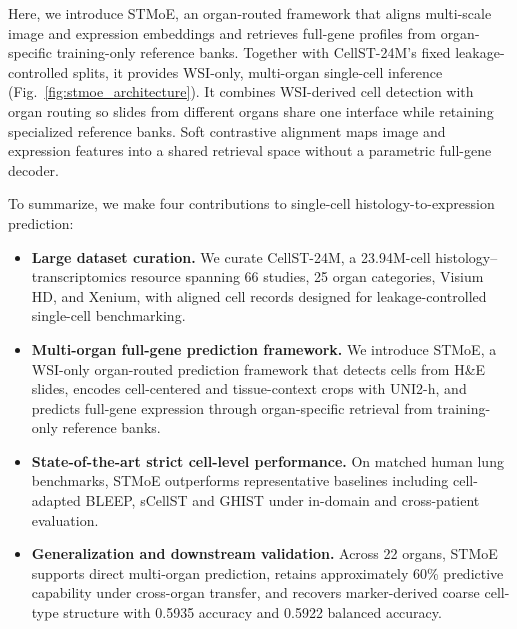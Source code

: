 \documentclass[sigconf]{acmart}
\newcommand{\dataset}{CellST-24M\xspace}
\newcommand{\method}{STMoE\xspace}
\begin{document}
Here, we introduce \method{}, an organ-routed framework that aligns multi-scale image and expression embeddings and retrieves full-gene profiles from organ-specific training-only reference banks. Together with \dataset{}'s fixed leakage-controlled splits, it provides WSI-only, multi-organ single-cell inference (Fig.~\ref{fig:stmoe_architecture}). It combines WSI-derived cell detection with organ routing so slides from different organs share one interface while retaining specialized reference banks. Soft contrastive alignment maps image and expression features into a shared retrieval space without a parametric full-gene decoder.

To summarize, we make four contributions to single-cell histology-to-expression prediction:
\begin{itemize}[leftmargin=*]
    \item \textbf{Large dataset curation.} We curate \dataset{}, a 23.94M-cell histology--transcriptomics resource spanning 66 studies, 25 organ categories, Visium HD, and Xenium, with aligned cell records designed for leakage-controlled single-cell benchmarking.
    \item \textbf{Multi-organ full-gene prediction framework.} We introduce \method{}, a WSI-only organ-routed prediction framework that detects cells from H\&E slides, encodes cell-centered and tissue-context crops with UNI2-h, and predicts full-gene expression through organ-specific retrieval from training-only reference banks.
    \item \textbf{State-of-the-art strict cell-level performance.} On matched human lung benchmarks, \method{} outperforms representative baselines including cell-adapted BLEEP, sCellST and GHIST under in-domain and cross-patient evaluation.
    \item \textbf{Generalization and downstream validation.} Across 22 organs, \method{} supports direct multi-organ prediction, retains approximately 60\% predictive capability under cross-organ transfer, and recovers marker-derived coarse cell-type structure with 0.5935 accuracy and 0.5922 balanced accuracy.
\end{itemize}
\end{document}
